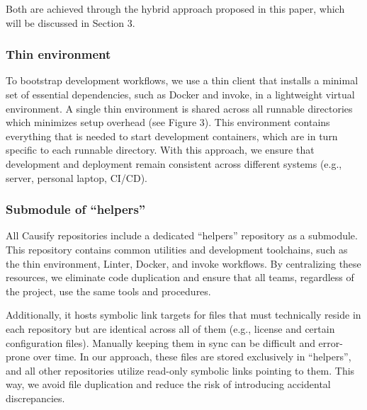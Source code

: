 \documentclass{article}
\begin{document}
Both are achieved through the hybrid approach proposed in this paper, which will
be discussed in Section 3.

\subsubsection{Thin environment}

To bootstrap development workflows, we use a thin client that installs a minimal
set of essential dependencies, such as Docker and invoke, in a lightweight
virtual environment. A single thin environment is shared across all runnable directories
which minimizes setup overhead (see Figure 3). This environment contains
everything that is needed to start development containers, which are in turn specific
to each runnable directory. With this approach, we ensure that development and deployment
remain consistent across different systems (e.g., server, personal laptop, CI/CD).

%
%
%

\subsubsection{Submodule of ``helpers''}

All Causify repositories include a dedicated ``helpers'' repository as a submodule.
This repository contains common utilities and development toolchains, such as the
thin environment, Linter, Docker, and invoke workflows. By centralizing these resources,
we eliminate code duplication and ensure that all teams, regardless of the project,
use the same tools and procedures.

Additionally, it hosts symbolic link targets for files that must technically reside
in each repository but are identical across all of them (e.g., license and
certain configuration files). Manually keeping them in sync can be difficult and
error-prone over time. In our approach, these files are stored exclusively in ``helpers'',
and all other repositories utilize read-only symbolic links pointing to them.
This way, we avoid file duplication and reduce the risk of introducing accidental
discrepancies.
\end{document}
